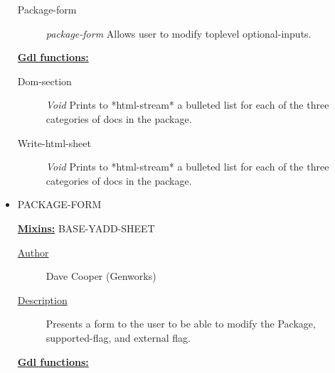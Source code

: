 \documentclass [11pt]{book}
\begin{document}
\begin{itemize}
\begin{description}

\item [Package-form]
\emph{package-form} Allows user to modify toplevel optional-inputs.


\end{description}






\textbf{
\underline{Gdl functions:}}

\begin{description}

\item [Dom-section]
\emph{Void} Prints to *html-stream* a bulleted list for each of the three categories of docs in the package.


\item [Write-html-sheet]
\emph{Void} Prints to *html-stream* a bulleted list for each of the three categories of docs in the package.


\end{description}







\item {}PACKAGE-FORM


\textbf{
\underline{Mixins:}} BASE-YADD-SHEET





\begin{description}

\item [
\underline{Author}]


Dave Cooper (Genworks)



\item [
\underline{Description}]


Presents a form to the user to be able to modify the Package, 
supported-flag, and external flag.



\end{description}








\textbf{
\underline{Gdl functions:}}


\end{itemize}
\end{document}
